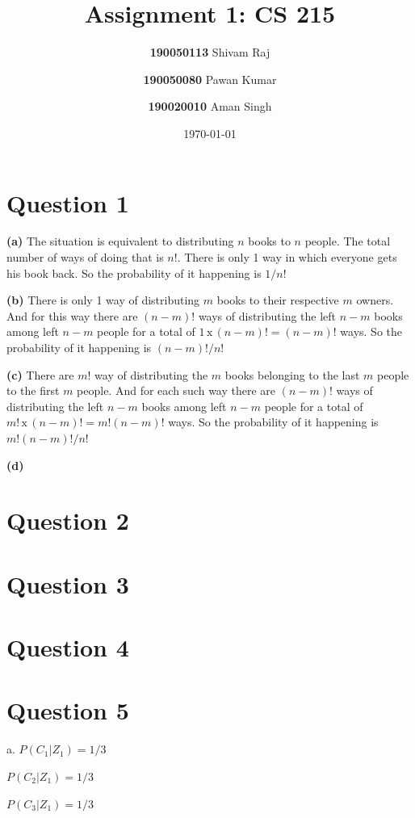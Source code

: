 \documentclass{article}
\title{Assignment 1: CS 215}
\author{
  \textbf{190050113} Shivam Raj
  \and
  \textbf{190050080} Pawan Kumar
  \and
  \textbf{190020010} Aman Singh
}
\date{\today}
\theoremstyle{remark}
\begin{document}
\maketitle
\tableofcontents

\newpage
{}

\section{Question 1}
\textbf{(a)} The situation is equivalent to distributing $n$ books to $n$ people. The total number of ways of doing that is $n!$. There is only 1 way in which everyone gets his book back. So the probability of it happening is $\boxed{1/n!}$ \par

\textbf{(b)} There is only 1 way of distributing $m$ books to their respective $m$ owners. And for this way there are $(n-m)!$ ways of distributing the left $n-m$ books among left $n-m$ people for a total of $1\,\text{x}\,(n-m)!=(n-m)!$ ways. So the probability of it happening is $\boxed{(n-m)!/n!}$ \par

\textbf{(c)} There are $m!$ way of distributing the $m$ books belonging to the last $m$ people to the first $m$ people. And for each such way there are $(n-m)!$ ways of distributing the left $n-m$ books among left $n-m$ people for a total of $m!\,\text{x}\,(n-m)!=m!(n-m)!$ ways. So the probability of it happening is $\boxed{m!(n-m)!/n!}$ \par

\textbf{(d)}

\section{Question 2}
\section{Question 3}
\section{Question 4}
\section{Question 5}
a.
$P(C_1|Z_1)=1/3$ \par
\hspace{1.25em}$P(C_2|Z_1)=1/3$ \par
\hspace{1.25em}$P(C_3|Z_1)=1/3$  \par
\end{document}
